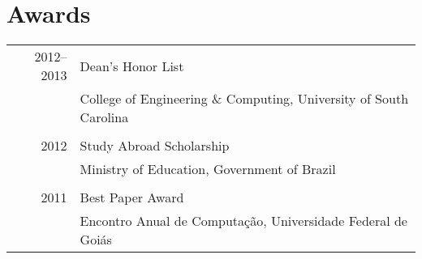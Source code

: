 \documentclass[a4paper,10pt]{article}
\begin{document}
\section{Awards}
\begin{tabular}{r|p{11cm}}

  \textsc{2012--2013}
  & Dean's Honor List\\
  & College of Engineering \& Computing, University of South Carolina\\
  \multicolumn{2}{c}{}\\

  \textsc{2012}
  & Study Abroad Scholarship\\
  & Ministry of Education, Government of Brazil\\
  \multicolumn{2}{c}{}\\

  \textsc{2011}
  & Best Paper Award\\
  & Encontro Anual de Computação, Universidade Federal de Goiás\\

\end{tabular}
\end{document}
